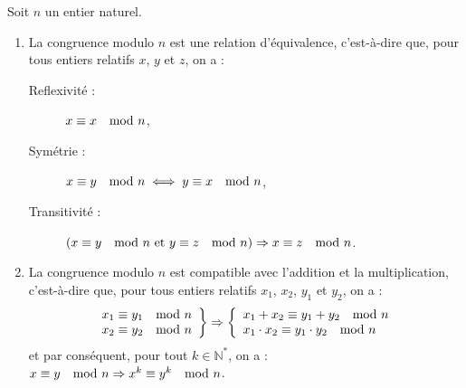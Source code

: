      \begin{thm}
            Soit $n$ un entier naturel.
            \begin{enumerate}
                  \item La congruence modulo $n$ est une relation d'\'equivalence, 
                        c'est-\`a-dire que, pour tous entiers relatifs $x$, $y$ et $z$, on a :
                        \begin{description}
                              \item[Reflexivit\'e :] 
                                    $x \equiv x \quad \mathrm{mod}\ n$,
                              \item[Sym\'etrie :] 
                                    $x \equiv y \quad \mathrm{mod}\ n \iff y \equiv x \quad \mathrm{mod}\ n$,
                              \item[Transitivit\'e :] 
                                    $\left( x \equiv y \quad \mathrm{mod}\ n \text{ et } y \equiv z \quad \mathrm{mod}\ n \right) \Rightarrow x \equiv z \quad \mathrm{mod}\ n$.
                        \end{description}
                  \item La congruence modulo $n$ est compatible avec l'addition et la multiplication, 
                        c'est-\`a-dire que, pour tous entiers relatifs $x_1$, $x_2$, $y_1$ et $y_2$, on a :
                        \begin{displaymath}
                              \left.
                                    \begin{array}{l}
                                          x_1 \equiv y_1 \quad \mathrm{mod}\ n \\
                                          x_2 \equiv y_2 \quad \mathrm{mod}\ n
                                    \end{array}
                              \right\rbrace
                              \Rightarrow
                              \left\lbrace
                                    \begin{array}{l}
                                          x_1 + x_2 \equiv y_1 + y_2 \quad \mathrm{mod}\ n             \\
                                          x_1 \cdot x_2 \equiv y_1 \cdot y_2 \quad \mathrm{mod}\ n     \\
                                    \end{array}
                              \right.
                        \end{displaymath}
                        et par cons\'equent, pour tout $k\in\mathbb{N}^*$, on a :
                              $x \equiv y \quad \mathrm{mod}\ n \Rightarrow x^k \equiv y^k \quad \mathrm{mod}\ n$.
            \end{enumerate}
      \end{thm}
